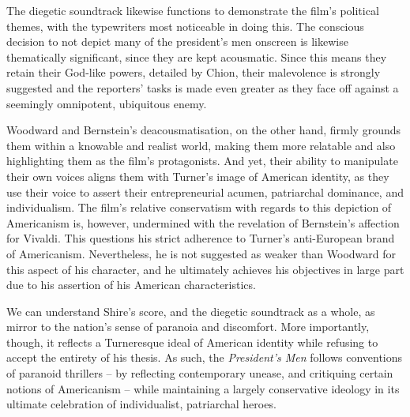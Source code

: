 The diegetic soundtrack likewise functions to demonstrate the film's political themes, with the typewriters most noticeable in doing this.
The conscious decision to not depict many of the president's men onscreen is likewise thematically significant, since they are kept acousmatic.
Since this means they retain their God-like powers, detailed by Chion, their malevolence is strongly suggested and the reporters' tasks is made even greater as they face off against a seemingly omnipotent, ubiquitous enemy.

Woodward and Bernstein's deacousmatisation, on the other hand, firmly grounds them within a knowable and realist world, making them more relatable and also highlighting them as the film's protagonists.
And yet, their ability to manipulate their own voices aligns them with Turner's image of American identity, as they use their voice to assert their entrepreneurial acumen, patriarchal dominance, and individualism.
The film's relative conservatism with regards to this depiction of Americanism is, however, undermined with the revelation of Bernstein's affection for Vivaldi.
This questions his strict adherence to Turner's anti-European brand of Americanism.
Nevertheless, he is not suggested as weaker than Woodward for this aspect of his character, and he ultimately achieves his objectives in large part due to his assertion of his American characteristics. 

We can understand Shire's score, and the diegetic soundtrack as a whole, as mirror to the nation's sense of paranoia and discomfort.
More importantly, though, it reflects a Turneresque ideal of American identity while refusing to accept the entirety of his thesis.
As such, the \textit{President's Men} follows conventions of paranoid thrillers – by reflecting contemporary unease, and critiquing certain notions of Americanism – while maintaining a largely conservative ideology in its ultimate celebration of individualist, patriarchal heroes.



